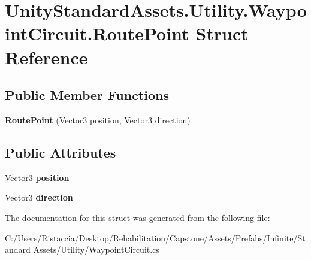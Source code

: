 \hypertarget{struct_unity_standard_assets_1_1_utility_1_1_waypoint_circuit_1_1_route_point}{}\section{Unity\+Standard\+Assets.\+Utility.\+Waypoint\+Circuit.\+Route\+Point Struct Reference}
\label{struct_unity_standard_assets_1_1_utility_1_1_waypoint_circuit_1_1_route_point}
\subsection*{Public Member Functions}
\begin{DoxyCompactItemize}
\item 
\mbox{\label{struct_unity_standard_assets_1_1_utility_1_1_waypoint_circuit_1_1_route_point_a05785eab6554b476e8a3ac1908a3ecd8}} 
{\bfseries Route\+Point} (Vector3 position, Vector3 direction)
\end{DoxyCompactItemize}
\subsection*{Public Attributes}
\begin{DoxyCompactItemize}
\item 
\mbox{\label{struct_unity_standard_assets_1_1_utility_1_1_waypoint_circuit_1_1_route_point_a0b89576da435ff5adc1d7effc44e7e2d}} 
Vector3 {\bfseries position}
\item 
\mbox{\label{struct_unity_standard_assets_1_1_utility_1_1_waypoint_circuit_1_1_route_point_a1bbfe4f0d556e9e9770a983d8dd52ee2}} 
Vector3 {\bfseries direction}
\end{DoxyCompactItemize}


The documentation for this struct was generated from the following file\+:\begin{DoxyCompactItemize}
\item 
C\+:/\+Users/\+Ristaccia/\+Desktop/\+Rehabilitation/\+Capstone/\+Assets/\+Prefabs/\+Infinite/\+Standard Assets/\+Utility/Waypoint\+Circuit.\+cs\end{DoxyCompactItemize}
